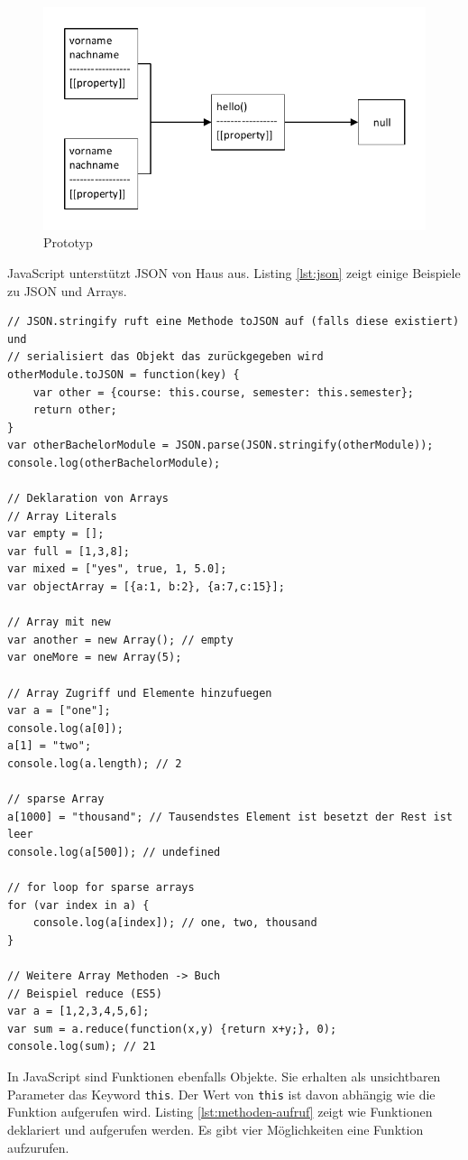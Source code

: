 \begin{figure}
\centering
\includegraphics[width=0.7\linewidth]{fig/prototyp}
\caption{Prototyp}
\label{fig:prototyp}
\end{figure}

JavaScript unterstützt JSON von Haus aus. Listing \ref{lst:json} zeigt einige Beispiele zu JSON und Arrays.

\begin{lstlisting}[label=lst:json,caption=JSON]
// JSON.stringify ruft eine Methode toJSON auf (falls diese existiert) und 
// serialisiert das Objekt das zurückgegeben wird
otherModule.toJSON = function(key) {
	var other = {course: this.course, semester: this.semester};
	return other;
}
var otherBachelorModule = JSON.parse(JSON.stringify(otherModule));
console.log(otherBachelorModule);

// Deklaration von Arrays
// Array Literals
var empty = [];
var full = [1,3,8];
var mixed = ["yes", true, 1, 5.0];
var objectArray = [{a:1, b:2}, {a:7,c:15}];

// Array mit new
var another = new Array(); // empty
var oneMore = new Array(5);

// Array Zugriff und Elemente hinzufuegen
var a = ["one"];
console.log(a[0]);
a[1] = "two";
console.log(a.length); // 2

// sparse Array
a[1000] = "thousand"; // Tausendstes Element ist besetzt der Rest ist leer
console.log(a[500]); // undefined

// for loop for sparse arrays
for (var index in a) {
	console.log(a[index]); // one, two, thousand
}

// Weitere Array Methoden -> Buch
// Beispiel reduce (ES5)
var a = [1,2,3,4,5,6];
var sum = a.reduce(function(x,y) {return x+y;}, 0);
console.log(sum); // 21
\end{lstlisting}

In JavaScript sind Funktionen ebenfalls Objekte. Sie erhalten als unsichtbaren Parameter das Keyword \lstinline|this|. Der Wert von \lstinline|this| ist davon abhängig wie die Funktion aufgerufen wird. Listing \ref{lst:methoden-aufruf} zeigt wie Funktionen deklariert und aufgerufen werden. Es gibt vier Möglichkeiten eine Funktion aufzurufen.

